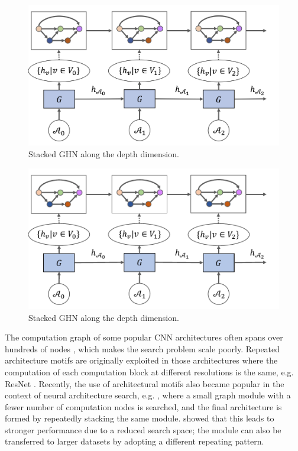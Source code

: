 \iflatexml
\begin{figure}
\includegraphics[width=4\linewidth]{figures/graph_cells.png}
\caption{Stacked GHN along the depth dimension.}
\label{fig:graph_cells}
\end{figure}
\else
\begin{figure}
\vspace*{-0.5cm}
\includegraphics[width=\linewidth]{figures/graph_cells.pdf}
\caption{Stacked GHN along the depth dimension.}
\label{fig:graph_cells}
\end{figure}
\fi
The computation graph of some popular CNN architectures often spans over hundreds of nodes
\citep{he2016deep,huang2017densely}, which makes the search problem scale poorly. Repeated
architecture motifs are originally exploited in those architectures where the computation of each
computation block at different resolutions is the same, e.g. ResNet \citep{he2016resnet}. Recently,
the use of architectural motifs also became popular in the context of neural architecture search,
e.g. \citep{zoph2017learning, pham2018efficient}, where a small graph module with a fewer number of
computation nodes is searched, and the final architecture is formed by repeatedly stacking the same
module. \cite{zoph2017learning} showed that this leads to stronger performance due to a reduced
search space; the module can also be transferred to larger datasets by adopting a different
repeating pattern.

